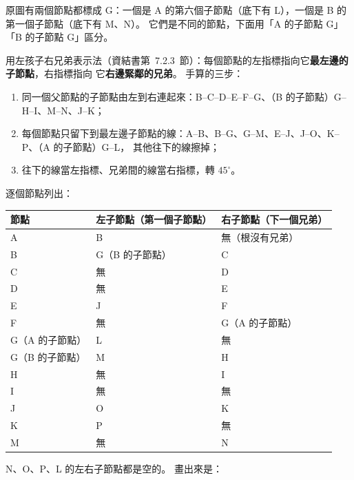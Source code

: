 \begin{pastsoln}
原圖有兩個節點都標成 G：一個是 A 的第六個子節點（底下有 L），一個是 B 的第一個子節點（底下有 M、N）。
它們是不同的節點，下面用「A 的子節點 G」「B 的子節點 G」區分。

用左孩子右兄弟表示法（資結書第~7.2.3~節）：每個節點的左指標指向它\textbf{最左邊的子節點}，右指標指向
它\textbf{右邊緊鄰的兄弟}。 手算的三步：
\begin{enumerate}
\item 同一個父節點的子節點由左到右連起來：B--C--D--E--F--G、（B 的子節點）G--H--I、M--N、J--K；
\item 每個節點只留下到最左邊子節點的線：A--B、B--G、G--M、E--J、J--O、K--P、（A 的子節點）G--L，
其他往下的線擦掉；
\item 往下的線當左指標、兄弟間的線當右指標，轉 $45^\circ$。
\end{enumerate}

逐個節點列出：
\begin{center}
\begin{tabular}{lll}
\toprule
節點 & 左子節點（第一個子節點） & 右子節點（下一個兄弟） \\
\midrule
A & B & 無（根沒有兄弟） \\
B & G（B 的子節點） & C \\
C & 無 & D \\
D & 無 & E \\
E & J & F \\
F & 無 & G（A 的子節點） \\
G（A 的子節點） & L & 無 \\
G（B 的子節點） & M & H \\
H & 無 & I \\
I & 無 & 無 \\
J & O & K \\
K & P & 無 \\
M & 無 & N \\
\bottomrule
\end{tabular}
\end{center}
N、O、P、L 的左右子節點都是空的。 畫出來是：

\begin{center}
\end{center}


\end{pastsoln}
